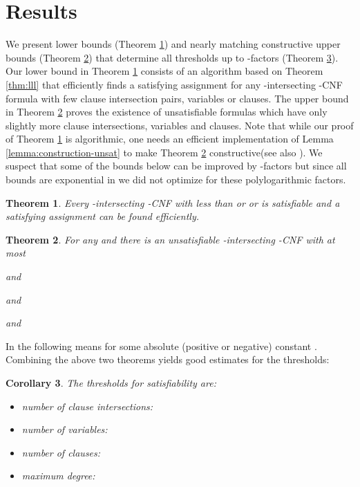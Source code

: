 \documentclass[11pt,letterpaper]{article}
\newtheorem{theorem}{Theorem}
\newtheorem{corollary}[theorem]{Corollary}
\begin{document}
\section{Results}

We present lower bounds (Theorem \ref{thm:lowerbound}) and nearly matching constructive upper bounds (Theorem \ref{thm:upperbound}) that determine all thresholds  up to -factors (Theorem \ref{thm:thresholds}). Our lower bound in Theorem \ref{thm:lowerbound} consists of an algorithm based on Theorem \ref{thm:lll} that efficiently finds a satisfying assignment for any -intersecting -CNF formula with few clause intersection pairs, variables or clauses. The upper bound in Theorem \ref{thm:upperbound} proves the existence of unsatisfiable formulas which have only slightly more clause intersections, variables and clauses. Note that while our proof of Theorem \ref{thm:lowerbound} is algorithmic, one needs an efficient implementation of Lemma \ref{lemma:construction-unsat} to make Theorem \ref{thm:upperbound} constructive(see also \cite{Scheder10}). We suspect that some of the bounds below can be improved by -factors but since all bounds are exponential in  we did not optimize for these polylogarithmic factors.


\begin{theorem}\label{thm:lowerbound}
Every -intersecting -CNF with less than 
 or
 or 
 is satisfiable and a satisfying assignment can be found efficiently.
\end{theorem}

\medskip

\begin{theorem}\label{thm:upperbound}
For any  and  there is an unsatisfiable -intersecting -CNF with at most

and 

and

and 

\end{theorem}

\medskip

In the following  means  for some absolute 
(positive or negative) constant . Combining the above two theorems yields good estimates for the thresholds: 

\begin{corollary}\label{thm:thresholds}
The thresholds for satisfiability are:
\begin{itemize}
	\item number of clause intersections: 
	\item number of variables: 
	\item number of clauses: 
	\item maximum degree:	
\end{itemize}
\end{corollary}
\end{document}
